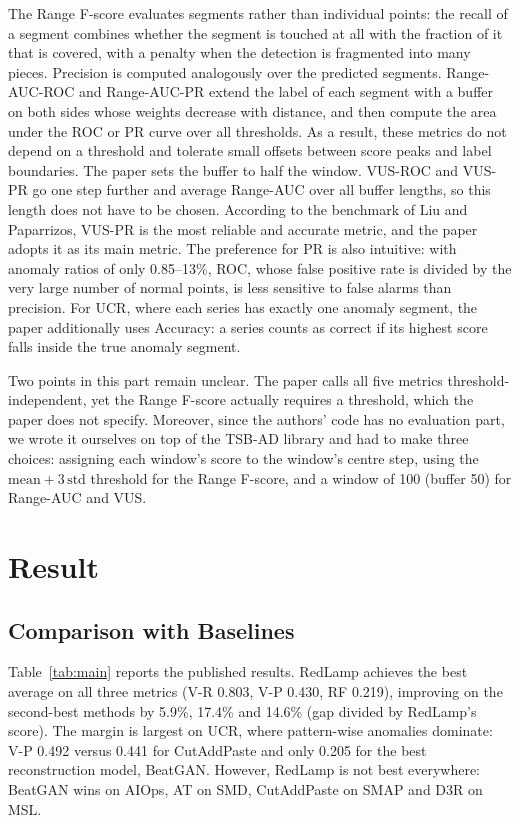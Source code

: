 \documentclass[sigconf,nonacm]{acmart}
\begin{document}
The Range F-score evaluates segments rather than individual points: the recall of a segment combines whether the segment is touched at all with the fraction of it that is covered, with a penalty when the detection is fragmented into many pieces. Precision is computed analogously over the predicted segments. Range-AUC-ROC and Range-AUC-PR extend the label of each segment with a buffer on both sides whose weights decrease with distance, and then compute the area under the ROC or PR curve over all thresholds. As a result, these metrics do not depend on a threshold and tolerate small offsets between score peaks and label boundaries. The paper sets the buffer to half the window. VUS-ROC and VUS-PR go one step further and average Range-AUC over all buffer lengths, so this length does not have to be chosen. According to the benchmark of Liu and Paparrizos, VUS-PR is the most reliable and accurate metric, and the paper adopts it as its main metric. The preference for PR is also intuitive: with anomaly ratios of only 0.85--13\%, ROC, whose false positive rate is divided by the very large number of normal points, is less sensitive to false alarms than precision. For UCR, where each series has exactly one anomaly segment, the paper additionally uses Accuracy: a series counts as correct if its highest score falls inside the true anomaly segment.

Two points in this part remain unclear. The paper calls all five metrics threshold-independent, yet the Range F-score actually requires a threshold, which the paper does not specify. Moreover, since the authors' code has no evaluation part, we wrote it ourselves on top of the TSB-AD library and had to make three choices: assigning each window's score to the window's centre step, using the $\text{mean} + 3\,\text{std}$ threshold for the Range F-score, and a window of 100 (buffer 50) for Range-AUC and VUS.

\section{Result}
\subsection{Comparison with Baselines}
Table~\ref{tab:main} reports the published results. RedLamp achieves the best average on all three metrics (V-R 0.803, V-P 0.430, RF 0.219), improving on the second-best methods by 5.9\%, 17.4\% and 14.6\% (gap divided by RedLamp's score). The margin is largest on UCR, where pattern-wise anomalies dominate: V-P 0.492 versus 0.441 for CutAddPaste and only 0.205 for the best reconstruction model, BeatGAN. However, RedLamp is not best everywhere: BeatGAN wins on AIOps, AT on SMD, CutAddPaste on SMAP and D3R on MSL.
\end{document}
